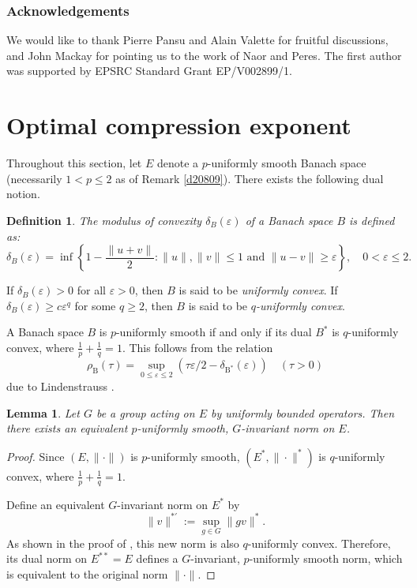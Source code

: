 \documentclass[12pt]{amsart}
\newtheorem{lemma}[theorem]{Lemma}
\newtheorem{definition}[theorem]{Definition}
\theoremstyle{definition}
\begin{document}
\subsubsection{Acknowledgements}
\label{sec:acknowledgements}

We would like to thank Pierre Pansu and Alain Valette for fruitful
discussions, and John Mackay for pointing us to the work of Naor and
Peres. The first author was supported by EPSRC Standard Grant
EP/V002899/1.




\section{Optimal compression exponent}
\label{sec:optimal_compression_exponent}

Throughout this section, let \(E\) denote a \(p\)-uniformly smooth
Banach space (necessarily \(1 <p \leq 2\) as of Remark \ref{d20809}).
There exists the following dual notion.


\begin{definition}
The \emph{modulus of convexity} \(\delta_B(\varepsilon)\) of a Banach
space \(B\) is defined as:
\[\delta_B(\varepsilon) = \inf \left\{ 1 - \frac{\|u + v\|}{2} : \|u\|, \|v\| \leq 1 \text{ and } \|u - v\| \geq \varepsilon \right\}, \quad 0 < \varepsilon \leq 2.\]
\end{definition}

If \(\delta_B(\varepsilon) > 0\) for all \(\varepsilon > 0\), then \(B\)
is said to be \emph{uniformly convex}. If
\(\delta_B(\varepsilon) \geq c \varepsilon^q\) for some \(q \geq 2\),
then \(B\) is said to be \emph{\(q\)-uniformly convex}.


A Banach space \(B\) is \(p\)-uniformly smooth if and only if its dual
\(B^*\) is \(q\)-uniformly convex, where
\(\frac{1}{p} + \frac{1}{q} = 1\). This follows from the relation
\[\rho_{\mathrm{B}}(\tau)=\sup _{0 \leq \varepsilon \leq 2}\left(\tau \varepsilon / 2-\delta_{\mathrm{B}^{*}}(\varepsilon)\right) \quad(\tau>0)\]
due to Lindenstrauss \cite[Theorem~1]{Lindenstrauss1963}.


\begin{lemma}
\label{b8e205}
Let \(G\) be a group acting on \(E\) by uniformly bounded operators.
Then there exists an equivalent \(p\)-uniformly smooth, \(G\)-invariant
norm on \(E\).
\end{lemma}

\begin{proof}
Since \((E,\|\cdot\|)\) is \(p\)-uniformly smooth, \((E^*,\|\cdot\|^*)\)
is \(q\)-uniformly convex, where \(\frac{1}{p} + \frac{1}{q} = 1\).

Define an equivalent \(G\)-invariant norm on \(E^*\) by
\[\|v\|^{*'} := \sup_{g \in G} \|gv\|^*.\] As shown in the proof of
\cite[Proposition~2.3]{Bader2007}, this new norm is also \(q\)-uniformly
convex. Therefore, its dual norm on \(E^{**} = E\) defines a
\(G\)-invariant, \(p\)-uniformly smooth norm, which is equivalent to the
original norm \(\|\cdot\|\).

\end{proof}
\end{document}
